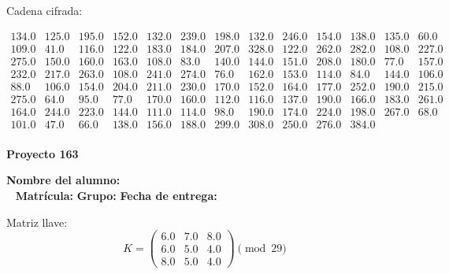 \documentclass[12pt]{article}
\begin{document}
Cadena cifrada:
\begin{center}
$\begin{array}{lllllllllllll}
134.0 & 125.0 & 195.0 & 152.0 & 132.0 & 239.0 & 198.0 & 132.0 & 246.0 & 154.0 & 138.0 & 135.0 & 60.0\\
109.0 & 41.0 & 116.0 & 122.0 & 183.0 & 184.0 & 207.0 & 328.0 & 122.0 & 262.0 & 282.0 & 108.0 & 227.0\\
275.0 & 150.0 & 160.0 & 163.0 & 108.0 & 83.0 & 140.0 & 144.0 & 151.0 & 208.0 & 180.0 & 77.0 & 157.0\\
232.0 & 217.0 & 263.0 & 108.0 & 241.0 & 274.0 & 76.0 & 162.0 & 153.0 & 114.0 & 84.0 & 144.0 & 106.0\\
88.0 & 106.0 & 154.0 & 204.0 & 211.0 & 230.0 & 170.0 & 152.0 & 164.0 & 177.0 & 252.0 & 190.0 & 215.0\\
275.0 & 64.0 & 95.0 & 77.0 & 170.0 & 160.0 & 112.0 & 116.0 & 137.0 & 190.0 & 166.0 & 183.0 & 261.0\\
164.0 & 244.0 & 223.0 & 144.0 & 111.0 & 114.0 & 98.0 & 190.0 & 174.0 & 224.0 & 198.0 & 267.0 & 68.0\\
101.0 & 47.0 & 66.0 & 138.0 & 156.0 & 188.0 & 299.0 & 308.0 & 250.0 & 276.0 & 384.0\\
\end{array}$
\end{center}

\newpage


\textbf{Proyecto 163}

\textbf{Nombre del alumno:} \underline{\hspace{13cm}}\\\
\vspace{1cm}
\textbf{Matrícula:} \underline{\hspace{4cm}} \hspace{1cm}
\textbf{Grupo:} \underline{\hspace{2cm}}
\textbf{Fecha de entrega:} \underline{\hspace{2cm}}

\medskip

Matriz llave:
\[
K = \begin{pmatrix}
6.0 & 7.0 & 8.0\\
6.0 & 5.0 & 4.0\\
8.0 & 5.0 & 4.0
\end{pmatrix} \pmod{29}
\]
\end{document}
